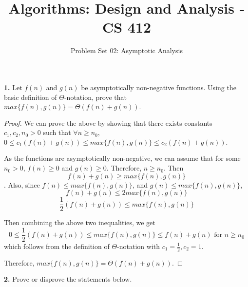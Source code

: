 \documentclass[addpoints]{exam}
\title{Algorithms: Design and Analysis - CS 412 }
\author{Problem Set 02: Asymptotic Analysis}
\date{}
\begin{document}
\maketitle

\begin{questions}
  \question
  \textbf{1. } Let $ f(n) $ and $ g(n) $ be asymptotically non-negative functions. Using the basic definition of $ \Theta $-notation, prove that $ max\{f(n), g(n)\} = \Theta(f(n) + g(n)) $.
  \begin{solution}
    \begin{proof} \vspace*{-4mm}
      We can prove the above by showing that there exists constants $ c_1, c_2, n_0 > 0 $ such that $ \forall n \geq n_0 $, $ 0 \leq c_1(f(n) + g(n)) \leq max \{ f(n), g(n) \} \leq c_2(f(n) + g(n)) $.

      As the functions are asymptotically non-negative, we can assume that for some $ n_0 > 0 $, $ f(n) \geq 0 $ and $ g(n) \geq 0 $. Therefore, $ n \geq n_0 $. Then $$ f(n) + g(n) \geq max\{f(n), g(n)\} $$.
      Also, since $ f(n) \leq max\{f(n), g(n) \} $, and $ g(n) \leq max\{f(n), g(n) \} $, $$ f(n) + g(n) \leq 2max\{f(n), g(n) \} $$ $$ \frac{1}{2}(f(n) + g(n)) \leq max\{f(n), g(n) \} $$

      Then combining the above two inequalities, we get $$ 0 \leq \frac{1}{2}(f(n) + g(n)) \leq max\{f(n), g(n) \} \leq f(n) + g(n) \text{ for } n \geq n_0 $$ which follows from the definition of $ \Theta $-notation with $ c_1 = \frac{1}{2}, c_2 = 1 $.

      Therefore, $ max\{f(n), g(n)\} = \Theta(f(n) + g(n)) $.
    \end{proof}
  \end{solution}

  \question
  \textbf{2. } Prove or disprove the statements below.
  \begin{solution}
\end{solution}
\end{questions}
\end{document}
